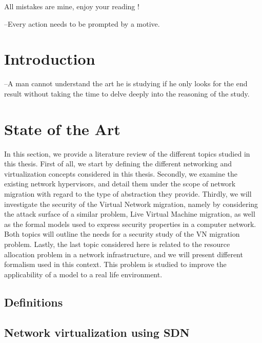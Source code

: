 \documentclass[a4paper, 11pt]{report}
\theoremstyle{definition}
\begin{document}
All mistakes are mine, enjoy your reading !

\newpage

\tableofcontents
\listoffigures
 \listoftables
\thispagestyle{empty}


\newpage
{}
\begin{savequote}
--Every action needs to be prompted by a motive.
\end{savequote}
\chapter{Introduction}

 

\newpage
\begin{savequote}[0.5\textwidth]
--A man cannot understand the art he is studying if he only looks for the end result without taking the time to delve deeply into the reasoning of the study.
\end{savequote}
\chapter{State of the Art}
\label{sec:sota}
In this section, we provide a literature review of the different topics studied in this thesis.
First of all, we start by defining the different networking and virtualization concepts considered in this thesis.
Secondly, we examine the existing network hypervisors, and detail them under the scope of network migration with regard to the type of abstraction they provide.
Thirdly, we will investigate the security of the Virtual Network migration, namely by considering the attack surface of a similar problem, Live Virtual Machine migration, as well as the formal models used to express security properties in a computer network.
Both topics will outline the needs for a security study of the VN migration problem.
Lastly, the last topic considered here is related to the resource allocation problem in a network infrastructure, and we will present different formalism used in this context.
This problem is studied to improve the applicability of a model to a real life environment.

\section{Definitions}
\label{sec:basic_def}


\section{Network virtualization using SDN}
\end{document}
